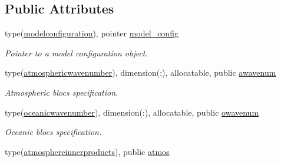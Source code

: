 \subsection*{Public Attributes}
\begin{DoxyCompactItemize}
\item 
\mbox{\label{structinprod__analytic_1_1innerproducts_a52339677473eea2827db0a0c5d160b37}} 
type(\hyperlink{structparams_1_1modelconfiguration}{modelconfiguration}), pointer \hyperlink{structinprod__analytic_1_1innerproducts_a52339677473eea2827db0a0c5d160b37}{model\+\_\+config}
\begin{DoxyCompactList}\small\item\em Pointer to a model configuration object. \end{DoxyCompactList}\item 
\mbox{\label{structinprod__analytic_1_1innerproducts_a030638396f82eb8c2419789708995d2d}} 
type(\hyperlink{structinprod__analytic_1_1atmosphericwavenumber}{atmosphericwavenumber}), dimension(\+:), allocatable, public \hyperlink{structinprod__analytic_1_1innerproducts_a030638396f82eb8c2419789708995d2d}{awavenum}
\begin{DoxyCompactList}\small\item\em Atmospheric blocs specification. \end{DoxyCompactList}\item 
\mbox{\label{structinprod__analytic_1_1innerproducts_a7cd1a769aa1468eafce276b25bde03ee}} 
type(\hyperlink{structinprod__analytic_1_1oceanicwavenumber}{oceanicwavenumber}), dimension(\+:), allocatable, public \hyperlink{structinprod__analytic_1_1innerproducts_a7cd1a769aa1468eafce276b25bde03ee}{owavenum}
\begin{DoxyCompactList}\small\item\em Oceanic blocs specification. \end{DoxyCompactList}\item 
\mbox{\label{structinprod__analytic_1_1innerproducts_a812c82c549eb1a53e3259844bb6766b4}} 
type(\hyperlink{structinprod__analytic_1_1atmosphereinnerproducts}{atmosphereinnerproducts}), public \hyperlink{structinprod__analytic_1_1innerproducts_a812c82c549eb1a53e3259844bb6766b4}{atmos}

\end{DoxyCompactItemize}
